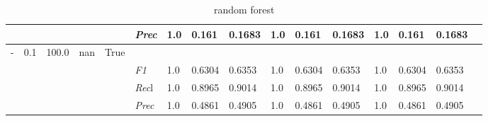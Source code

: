 \begin{table}[]
\begin{tabularx}{\textwidth}{XXXXX|X|XXX|XXX|XXXX}
    & & & & & \textit{Prec} & 1.0 & 0.161 & 0.1683 & 1.0 & 0.161 & 0.1683 & 1.0 & 0.161 & 0.1683 \\ \midrule
    - & 0.1 & 100.0 & nan & True& & & & & & & & & \\
    & & & & & \textit{F1} & 1.0 & 0.6304 & 0.6353 & 1.0 & 0.6304        & 0.6353        & 1.0        & 0.6304        & 0.6353        \\
    & & & & & \textit{Rec}l & 1.0 & 0.8965 & 0.9014    & 1.0 & 0.8965    & 0.9014    & 1.0    & 0.8965    & 0.9014    \\
    & & & & & \textit{Prec} & 1.0 & 0.4861 & 0.4905 & 1.0 & 0.4861 & 0.4905 & 1.0 & 0.4861 & 0.4905 \\ \midrule
    \end{tabularx}
    \caption{random forest}
    \label{tab:all_results_random_forest}
    \end{table}
    
